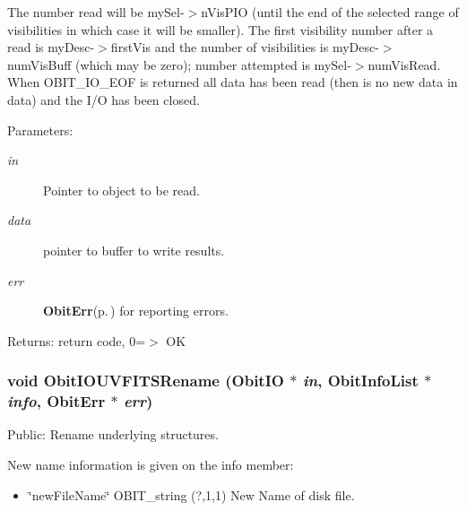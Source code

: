 The number read will be my\-Sel-$>$n\-Vis\-PIO (until the end of the selected range of visibilities in which case it will be smaller). The first visibility number after a read is my\-Desc-$>$first\-Vis and the number of visibilities is my\-Desc-$>$num\-Vis\-Buff (which may be zero); number attempted is my\-Sel-$>$num\-Vis\-Read. When OBIT\_\-IO\_\-EOF is returned all data has been read (then is no new data in data) and the I/O has been closed. \begin{Desc}
\item[Parameters:]
\begin{description}
\item[{\em in}]Pointer to object to be read. \item[{\em data}]pointer to buffer to write results. \item[{\em err}]{\bf Obit\-Err}{\rm (p.\,\pageref{structObitErr})} for reporting errors. \end{description}
\end{Desc}
\begin{Desc}
\item[Returns:]return code, 0=$>$ OK \end{Desc}
\subsubsection{\setlength{\rightskip}{0pt plus 5cm}void Obit\-IOUVFITSRename ({\bf Obit\-IO} $\ast$ {\em in}, {\bf Obit\-Info\-List} $\ast$ {\em info}, {\bf Obit\-Err} $\ast$ {\em err})}\label{ObitIOUVFITS_8h_a8}


Public: Rename underlying structures. 

New name information is given on the info member: \begin{itemize}
\item \char`\"{}new\-File\-Name\char`\"{} OBIT\_\-string (?,1,1) New Name of disk file. 
\end{itemize}

